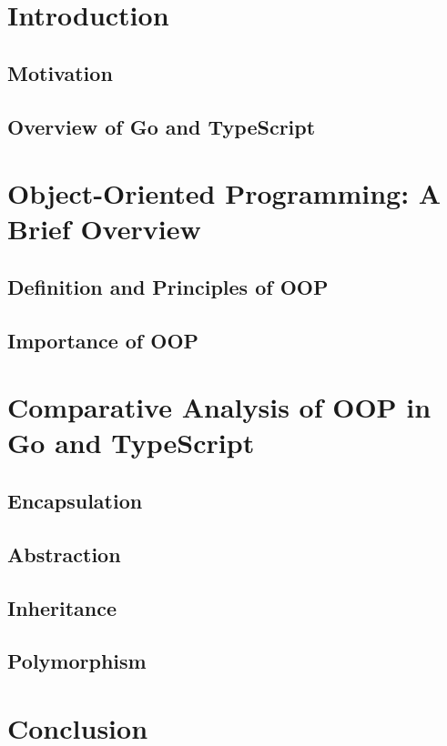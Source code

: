 \chapter{Introduction}
\section{Motivation}
\section{Overview of Go and TypeScript}

\chapter{Object-Oriented Programming: A Brief Overview}
\section{Definition and Principles of OOP}
\section{Importance of OOP}

\chapter{Comparative Analysis of OOP in Go and TypeScript}
\section{Encapsulation}
\section{Abstraction}
\section{Inheritance}
\section{Polymorphism}

\chapter{Conclusion}





